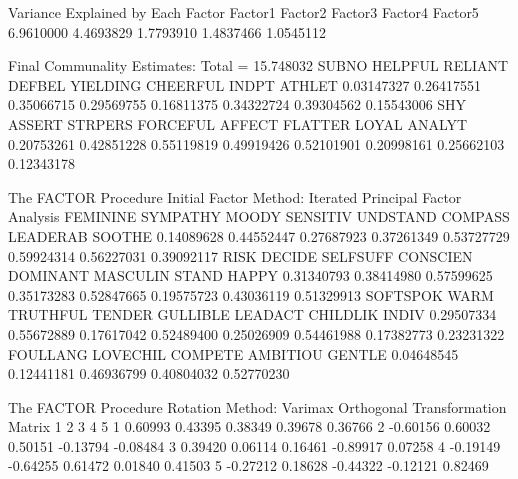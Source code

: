 \documentclass{article}
\begin{document}
\begin{Woutput}
                     Variance Explained by Each Factor
   Factor1         Factor2         Factor3         Factor4         Factor5
 6.9610000       4.4693829       1.7793910       1.4837466       1.0545112

                        Final Communality Estimates: Total = 15.748032
     SUBNO     HELPFUL     RELIANT      DEFBEL    YIELDING    CHEERFUL       INDPT      ATHLET
0.03147327  0.26417551  0.35066715  0.29569755  0.16811375  0.34322724  0.39304562  0.15543006
       SHY      ASSERT     STRPERS    FORCEFUL      AFFECT     FLATTER       LOYAL      ANALYT
0.20753261  0.42851228  0.55119819  0.49919426  0.52101901  0.20998161  0.25662103  0.12343178

The FACTOR Procedure
Initial Factor Method: Iterated Principal Factor Analysis
  FEMININE    SYMPATHY       MOODY    SENSITIV    UNDSTAND     COMPASS    LEADERAB      SOOTHE
0.14089628  0.44552447  0.27687923  0.37261349  0.53727729  0.59924314  0.56227031  0.39092117
      RISK      DECIDE    SELFSUFF    CONSCIEN    DOMINANT    MASCULIN       STAND       HAPPY
0.31340793  0.38414980  0.57599625  0.35173283  0.52847665  0.19575723  0.43036119  0.51329913
  SOFTSPOK        WARM    TRUTHFUL      TENDER    GULLIBLE     LEADACT    CHILDLIK       INDIV
0.29507334  0.55672889  0.17617042  0.52489400  0.25026909  0.54461988  0.17382773  0.23231322
  FOULLANG        LOVECHIL         COMPETE        AMBITIOU          GENTLE
0.04648545      0.12441181      0.46936799      0.40804032      0.52770230

The FACTOR Procedure
Rotation Method: Varimax
                            Orthogonal Transformation Matrix
                       1               2               3               4               5
       1         0.60993         0.43395         0.38349         0.39678         0.36766
       2        -0.60156         0.60032         0.50151        -0.13794        -0.08484
       3         0.39420         0.06114         0.16461        -0.89917         0.07258
       4        -0.19149        -0.64255         0.61472         0.01840         0.41503
       5        -0.27212         0.18628        -0.44322        -0.12121         0.82469


\end{Woutput}
\end{document}
